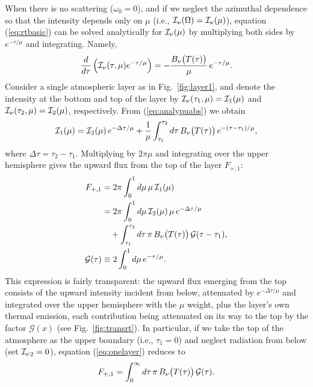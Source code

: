When there is no scattering ($\omega_0=0$), and if we neglect the azimuthal dependence so that the intensity depends only on $\mu$ (i.e., ${\mathcal{I}_\nu}(\Omega)={\mathcal{I}_\nu}(\mu)$), equation (\ref{eq:rtbasic}) can be solved analytically for ${\mathcal{I}_\nu}(\mu)$ by multiplying both sides by $e^{-\tau/\mu}$ and integrating. Namely,
\begin{align}
\label{eq:analypuabs}
\frac{d}{d \tau} \left( {\mathcal{I}_\nu}(\tau,\mu) e^{-\tau/\mu} \right) = - \frac{B_\nu \bigl(T(\tau)\bigr)}{\mu} \, e^{-\tau/\mu} .
\end{align}
Consider a single atmospheric layer as in Fig.~\ref{fig:layer1}, and denote the intensity at the bottom and top of the layer by ${\mathcal{I}_\nu}(\tau_1,\mu)={\mathcal{I}}_1(\mu)$ and ${\mathcal{I}_\nu}(\tau_2,\mu)={\mathcal{I}}_2(\mu)$, respectively. From (\ref{eq:analypuabs}) we obtain
\begin{align}
{\mathcal{I}}_1 (\mu) = {\mathcal{I}}_2 (\mu) \, e^{-\Delta \tau/\mu} + \frac{1}{\mu} \int_{\tau_1}^{\tau_2} d \tau \, B_\nu \bigl(T(\tau)\bigr) \, e^{- (\tau - \tau_1)/\mu} ,
\end{align}
where $\Delta \tau=\tau_2-\tau_1$. Multiplying by $2\pi\mu$ and integrating over the upper hemisphere gives the upward flux from the top of the layer $F_{+,1}$:
\begin{align}
\label{eq:onelayer}
F_{+,1} &= 2 \pi \int_{0}^1 d\mu \, \mu \, {\mathcal{I}}_1 (\mu) \\
&= 2 \pi \int_{0}^1 d\mu \, {\mathcal{I}}_2 (\mu) \, \mu \, e^{-\Delta \tau/\mu} \nonumber \\
&\quad +  \int_{\tau_1}^{\tau_2} d \tau \, \pi \, B_\nu \bigl(T(\tau)\bigr) \, \mathcal{G} (\tau - \tau_1) ,\\
\mathcal{G} (\tau) &\equiv 2 \int_{0}^1 d\mu \, e^{-\tau/\mu} .
\end{align}
This expression is fairly transparent: the upward flux emerging from the top consists of the upward intensity incident from below, attenuated by $e^{-\Delta \tau/\mu}$ and integrated over the upper hemisphere with the $\mu$ weight, plus the layer’s own thermal emission, each contribution being attenuated on its way to the top by the factor $\mathcal{G}(x)$ (see Fig.~\ref{fig:transrt}). In particular, if we take the top of the atmosphere as the upper boundary (i.e., $\tau_1=0$) and neglect radiation from below (set ${\mathcal{I}_\nu}_2=0$), equation (\ref{eq:onelayer}) reduces to
\begin{align}
\label{eq:onelayer_}
F_{+,1} = \int_{0}^{\infty} d \tau \, \pi \, B_\nu \bigl(T(\tau)\bigr) \, \mathcal{G} (\tau) .
\end{align}

